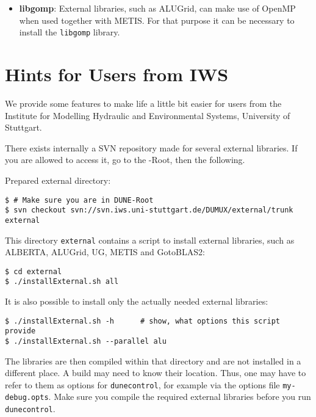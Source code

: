 \begin{itemize}
\item \textbf{libgomp}: External libraries, such as ALUGrid, can make use of OpenMP when used together with METIS. For that purpose it can be necessary to install the \texttt{libgomp} library.

\end{itemize}

\section{Hints for Users from IWS}
We provide some features to make life a little bit easier for
users from the Institute for Modelling Hydraulic and Environmental Systems, University of Stuttgart.

There exists internally a SVN repository made for several external libraries.
If you are allowed to access it, go to the {\Dune}-Root, then the following.

Prepared external directory:
\begin{lstlisting}[style=Bash]
$ # Make sure you are in DUNE-Root
$ svn checkout svn://svn.iws.uni-stuttgart.de/DUMUX/external/trunk external
\end{lstlisting}

This directory \texttt{external} contains a script to install external libraries, such as 
ALBERTA, ALUGrid, UG, METIS and GotoBLAS2:
\begin{lstlisting}[style=Bash]
$ cd external
$ ./installExternal.sh all
\end{lstlisting}

It is also possible to install only the actually needed external libraries:
\begin{lstlisting}[style=Bash]
$ ./installExternal.sh -h      # show, what options this script provide
$ ./installExternal.sh --parallel alu
\end{lstlisting}

The libraries are then compiled within that directory and are not installed in a different place. 
A \Dune build may need to know their location. Thus, one may have to refer to them as options for \texttt{dunecontrol}, 
for example via the options file \texttt{my-debug.opts}. Make sure you compile the required external libraries before 
you run \texttt{dunecontrol}.




